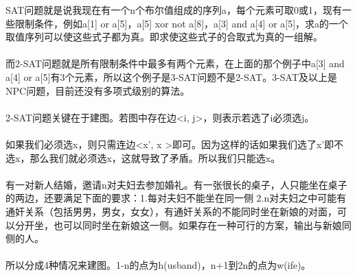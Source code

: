 SAT问题就是说我现在有一个n个布尔值组成的序列a，每个元素可取0或1，现有一些限制条件，例如a[1] or a[5]，a[5] xor not a[8]，a[3] and a[4] or a[5]，求a的一个取值序列可以使这些式子都为真。即求使这些式子的合取式为真的一组解。 \\
 \\
而2-SAT问题就是所有限制条件中最多有两个元素，在上面的那个例子中a[3] and a[4] or a[5]有3个元素，所以这个例子是3-SAT问题不是2-SAT。3-SAT及以上是NPC问题，目前还没有多项式级别的算法。 \\
 \\
2-SAT问题关键在于建图。若图中存在边<i, j>，则表示若选了i必须选j。 \\
 \\
如果我们必须选x，则只需连边<x', x >即可。因为这样的话如果我们选了x'即不选x，那么我们就必须选x，这就导致了矛盾。所以我们只能选x。 \\
 \\
有一对新人结婚，邀请n对夫妇去参加婚礼。有一张很长的桌子，人只能坐在桌子的两边，还要满足下面的要求：1.每对夫妇不能坐在同一侧 2.n对夫妇之中可能有通奸关系（包括男男，男女，女女），有通奸关系的不能同时坐在新娘的对面，可以分开坐，也可以同时坐在新娘这一侧。如果存在一种可行的方案，输出与新娘同侧的人。 \\
 \\
所以分成4种情况来建图。1-n的点为h(usband)，n+1到2n的点为w(ife)。
